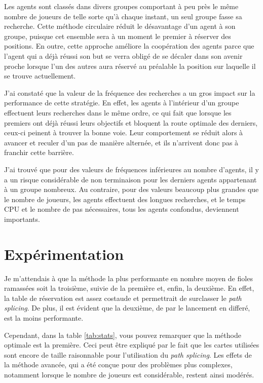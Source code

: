 \documentclass[letterpaper]{article}
\begin{document}
Les agents sont class\'es dans divers groupes comportant \`a peu pr\`es le m\^eme nombre de joueurs de telle sorte qu'\`a chaque instant, un seul groupe fasse sa recherche. 
Cette m\'ethode circulaire r\'eduit le d\'esavantage d'un agent \`a son groupe, puisque cet ensemble sera \`a un moment le premier \`a r\'eserver des positions.
En outre, cette approche am\'eliore la coop\'eration des agents parce que l'agent qui a d\'ej\`a r\'eussi son but se verra oblig\'e de se d\'ecaler dans son avenir proche lorsque l'un des autres aura r\'eserv\'e au pr\'ealable la position sur laquelle il se trouve actuellement.

J'ai constat\'e que la valeur de la fr\'equence des recherches a un gros impact sur la performance de cette strat\'egie.
En effet, les agents \`a l'int\'erieur d'un groupe effectuent leurs recherches dans le m\^eme ordre, ce qui fait que lorsque les premiers ont d\'ej\`a r\'eussi leurs objectifs et bloquent la route optimale des derniers, ceux-ci peinent \`a trouver la bonne voie. Leur comportement se r\'eduit alors \`a avancer et reculer d'un pas de mani\`ere altern\'ee, et ils n'arrivent donc pas \`a franchir cette barri\`ere.

J'ai trouv\'e que pour des valeurs de fr\'equences inf\'erieures au nombre d'agents, il y a un risque consid\'erable de non terminaison pour les derniers agents appartenant \`a un groupe nombreux. Au contraire, pour des valeurs beaucoup plus grandes que le nombre de joueurs, les agents effectuent des longues recherches, et le temps CPU et le nombre de pas n\'ecessaires, tous les agents confondus, deviennent importants.

\section{Exp\'erimentation}
Je m'attendais \`a que la m\'ethode la plus performante en nombre moyen de fioles ramass\'ees soit la troisi\`eme, suivie de la premi\`ere et, enfin, la deuxi\`eme.
En effet, la table de r\'eservation est assez costaude et permettrait de surclasser le \textit{path splicing}.
De plus, il est \'evident que la deuxi\`eme, de par le lancement en differ\'e, est la moins performante.

Cependant, dans la table \ref{tab:stats}, vous pouvez remarquer que la m\'ethode optimale est la premi\`ere.
Ceci peut \^etre expliqu\'e par le fait que les cartes utilis\'ees sont encore de taille raisonnable pour l'utilisation du \textit{path splicing}.
Les effets de la m\'ethode avanc\'ee, qui a \'et\'e con\c{c}ue pour des probl\`emes plus complexes, notamment lorsque le nombre de joueurs est consid\'erable, restent ainsi mod\'er\'es.
\end{document}
